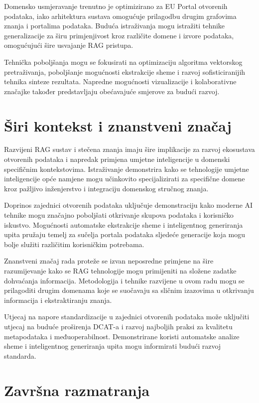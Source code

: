 Domensko usmjeravanje trenutno je optimizirano za EU Portal otvorenih podataka, iako arhitektura sustava omogućuje prilagodbu drugim grafovima znanja i portalima podataka. Buduća istraživanja mogu istražiti tehnike generalizacije za širu primjenjivost kroz različite domene i izvore podataka, omogućujući šire usvajanje RAG pristupa.

Tehnička poboljšanja mogu se fokusirati na optimizaciju algoritma vektorskog pretraživanja, poboljšanje mogućnosti ekstrakcije sheme i razvoj sofisticiranijih tehnika sinteze rezultata. Napredne mogućnosti vizualizacije i kolaborativne značajke također predstavljaju obećavajuće smjerove za budući razvoj.

\section{Širi kontekst i znanstveni značaj}
\label{sec:broader_context}

Razvijeni RAG sustav i stečena znanja imaju šire implikacije za razvoj ekosustava otvorenih podataka i napredak primjena umjetne inteligencije u domenski specifičnim kontekstovima. Istraživanje demonstrira kako se tehnologije umjetne inteligencije opće namjene mogu učinkovito specijalizirati za specifične domene kroz pažljivo inženjerstvo i integraciju domenskog stručnog znanja.

Doprinos zajednici otvorenih podataka uključuje demonstraciju kako moderne AI tehnike mogu značajno poboljšati otkrivanje skupova podataka i korisničko iskustvo. Mogućnosti automatske ekstrakcije sheme i inteligentnog generiranja upita pružaju temelj za sučelja portala podataka sljedeće generacije koja mogu bolje služiti različitim korisničkim potrebama.

Znanstveni značaj rada proteže se izvan neposredne primjene na šire razumijevanje kako se RAG tehnologije mogu primijeniti na složene zadatke dohvaćanja informacija. Metodologija i tehnike razvijene u ovom radu mogu se prilagoditi drugim domenama koje se suočavaju sa sličnim izazovima u otkrivanju informacija i ekstraktiranju znanja.

Utjecaj na napore standardizacije u zajednici otvorenih podataka može uključiti utjecaj na buduće proširenja DCAT-a i razvoj najboljih praksi za kvalitetu metapodataka i međuoperabilnost. Demonstrirane koristi automatske analize sheme i inteligentnog generiranja upita mogu informirati budući razvoj standarda.

\section{Završna razmatranja}
\label{sec:final_thoughts}

